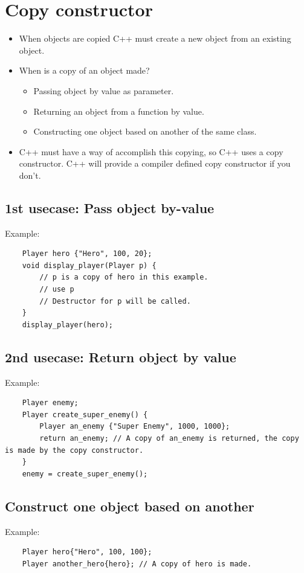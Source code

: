 \section{Copy constructor}
\begin{itemize}
    \item When objects are copied C++ must create a new object from an existing object.
    \item When is a copy of an object made?
        \begin{itemize}
            \item Passing object by value as parameter.
            \item Returning an object from a function by value.
            \item Constructing one object based on another of the same class.
        \end{itemize}
    
    \item C++ must have a way of accomplish this copying, so C++ uses a copy constructor. C++ will provide a compiler defined copy constructor if you don't.
\end{itemize}

\subsection{1st usecase: Pass object by-value}
Example:
\begin{verbatim}
    Player hero {"Hero", 100, 20};
    void display_player(Player p) {
        // p is a copy of hero in this example.
        // use p
        // Destructor for p will be called.
    }
    display_player(hero);
\end{verbatim}

\subsection{2nd usecase: Return object by value}
Example:
\begin{verbatim}
    Player enemy;
    Player create_super_enemy() {
        Player an_enemy {"Super Enemy", 1000, 1000};
        return an_enemy; // A copy of an_enemy is returned, the copy is made by the copy constructor.
    }
    enemy = create_super_enemy();
\end{verbatim}

\subsection{Construct one object based on another}
Example:
\begin{verbatim}
    Player hero{"Hero", 100, 100};
    Player another_hero{hero}; // A copy of hero is made.
\end{verbatim}

